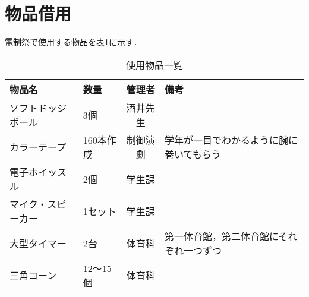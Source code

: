 \documentclass[dvipdfmx]{jsarticle}
\begin{document}
\section{物品借用}
電制祭で使用する物品を表\ref{buppin}に示す．
\begin{table}[H]
  \caption{使用物品一覧}
  \label{buppin}
  \centering
  \begin{tabular}{l|lcl}
    物品名       & 数量     & 管理者  & 備考                   \\\hline\hline
    ソフトドッジボール & 3個     & 酒井先生 &                      \\
    カラーテープ    & 160本作成 & 制御演劇 & 学年が一目でわかるように腕に巻いてもらう \\
    電子ホイッスル   & 2個     & 学生課  &                      \\
    マイク・スピーカー & 1セット   & 学生課  &                      \\
    大型タイマー    & 2台     & 体育科  & 第一体育館，第二体育館にそれぞれ一つずつ \\
    三角コーン     & 12～15個 & 体育科  &
  \end{tabular}
\end{table}
\end{document}
